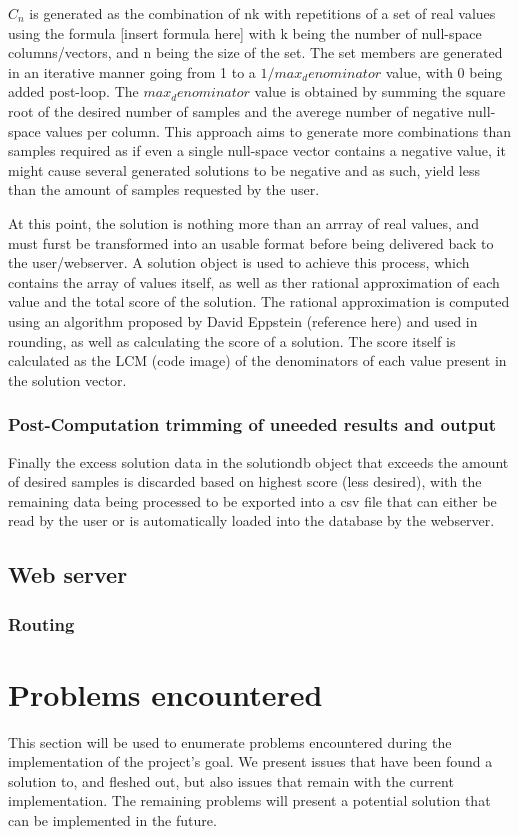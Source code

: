 $C_{n}$ is generated as the combination of nk with repetitions of a set of real values using the formula [insert formula here] with k being the number of null-space columns/vectors, and n being the size of the set. The set members are generated in an iterative manner going from 1 to a $1/max_denominator$ value, with 0 being added post-loop. The $max_denominator$ value is obtained by summing the square root of the desired number of samples and the averege number of negative null-space values per column. This approach aims to generate more combinations than samples required as if even a single null-space vector contains a negative value, it might cause several generated solutions to be negative and as such, yield less than the amount of samples requested by the user. 

At this point, the solution is nothing more than an arrray of real values, and must furst be transformed into an usable format before being delivered back to the user/webserver. A solution object is used to achieve this process, which contains the array of values itself, as well as ther rational approximation of each value and the total score of the solution. The rational approximation is computed using an algorithm proposed by David Eppstein (reference here) and used in rounding, as well as calculating the score of a solution. The score itself is calculated as the LCM (code image) of the denominators of each value present in the solution vector.

\subsubsection{Post-Computation trimming of uneeded results and output}
Finally the excess solution data in the solutiondb object that exceeds the amount of desired samples is discarded based on highest score (less desired), with the remaining data being processed to be exported into a csv file that can either be read by the user or is automatically loaded into the database by the webserver. \\

\subsection{Web server}
\subsubsection{Routing}


\section{Problems encountered}
This section will be used to enumerate problems encountered during the
implementation of the project’s goal. We present issues that have been found
a solution to, and fleshed out, but also issues that remain with the current
implementation. The remaining problems will present a potential solution
that can be implemented in the future. \\

